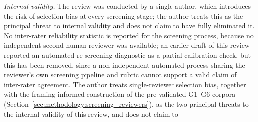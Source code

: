\textit{Internal validity.}
The review was conducted by a single author, which introduces the risk of selection bias at every screening stage; the author treats this as the principal threat to internal validity and does not claim to have fully eliminated it. No inter-rater reliability statistic is reported for the screening
process, because no independent second human reviewer was available; an
earlier draft of this review reported an automated re-screening
diagnostic as a partial calibration check, but this has been removed,
since a non-independent automated process sharing the reviewer's own
screening pipeline and rubric cannot support a valid claim of inter-rater
agreement. The author treats single-reviewer selection bias, together with the
framing-informed construction of the pre-validated G1--G6 corpora
(Section~\ref{sec:methodology:screening_reviewers}), as the two principal
threats to the internal validity of this review, and does not claim to
